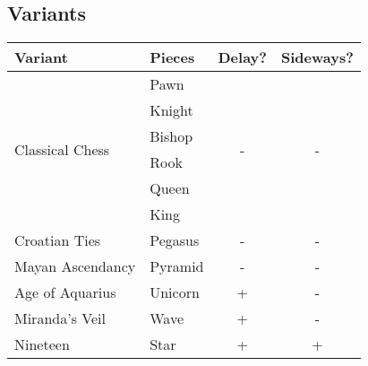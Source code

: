\clearpage %

\subsection*{Variants}
\label{sec:Appendix/Introduction/Variants}

\begin{table}[!h]
\centering
\begin{tabular}{ llcc }
\toprule %
\textbf{Variant}                 & \textbf{Pieces}   & \textbf{Delay?}      & \textbf{Sideways?}   \\
\midrule %
\multirow{6}{*}{Classical Chess} & Pawn              & \multirow{6}{*}{-}   & \multirow{6}{*}{-}   \\
                                 & Knight            &                      &                      \\
                                 & Bishop            &                      &                      \\
                                 & Rook              &                      &                      \\
                                 & Queen             &                      &                      \\
                                 & King              &                      &                      \\
\cmidrule{1-4} %
Croatian Ties                    & Pegasus           & -                    & -                    \\
Mayan Ascendancy                 & Pyramid           & -                    & -                    \\
Age of Aquarius                  & Unicorn           & +                    & -                    \\
Miranda's Veil                   & Wave              & +                    & -                    \\
Nineteen                         & Star              & +                    & +                    \\
\cmidrule{1-4} %

\end{tabular}
\end{table}

